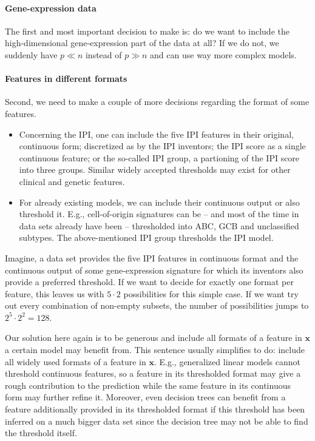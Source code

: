 \paragraph{Gene-expression data}
The first and most important decision to make is: do we want to include the high-dimensional
gene-expression part of the data at all? If we do not, we suddenly have $p \ll n$ instead of 
$p \gg n$ and can use way more complex models. 

\paragraph{Features in different formats}
Second, we need to make a couple of more decisions regarding the format of some features.
\begin{itemize}
    \item Concerning the IPI, one can include the five IPI features in their original, continuous 
        form; discretized as by the IPI inventors; the IPI score as a single continuous feature; 
        or the so-called IPI group, a partioning of the IPI score into three groups. Similar widely 
        accepted thresholds may exist for other clinical and genetic features.
    \item For already existing models, we can include their continuous output or also threshold 
        it. E.g., cell-of-origin signatures can be -- and most of the time in data sets already 
        have been -- thresholded into ABC, GCB and unclassified subtypes. The above-mentioned IPI 
        group thresholds the IPI model. 
\end{itemize}

Imagine, a data set provides the five IPI features in continuous format and the continuous output 
of some gene-expression signature for which 
its inventors also provide a preferred threshold. If we want to decide for exactly one format 
per feature, this leaves us with $5 \cdot 2$ possibilities for this simple case. If we want try out 
every combination of non-empty subsets, the number of possibilities jumps to $2^5 \cdot 2^2 = 
128$. 

Our solution here again is to be generous and include all formats of a feature in $\mathbf{x}$ a 
certain model may benefit from. This sentence usually 
simplifies to do: include all widely used formats of a feature in $\mathbf{x}$. E.g., generalized linear models
cannot threshold continuous features, so a feature in its thresholded format may give a rough 
contribution to the prediction while the same feature in its continuous form may further refine it.
Moreover, even decision trees can benefit from a feature additionally provided in its thresholded 
format if this threshold has been inferred on a much bigger data set since the decision tree 
may not be able to find the threshold itself.

